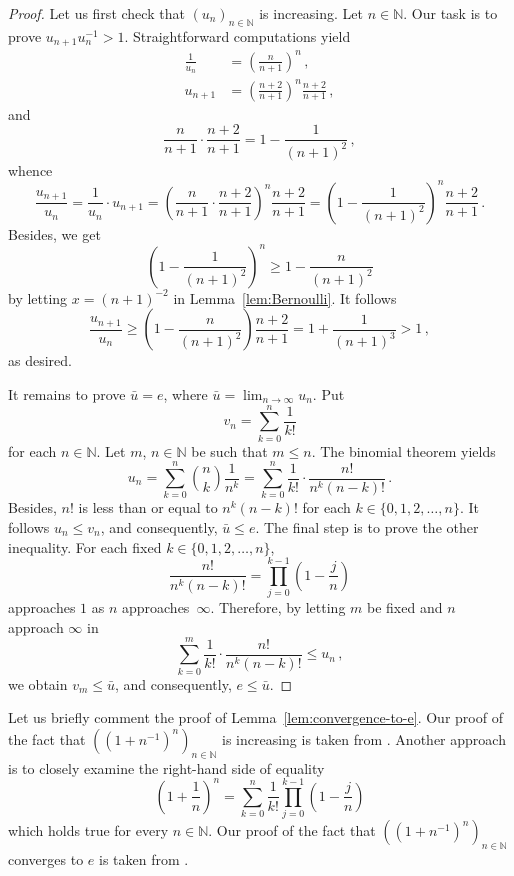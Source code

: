 \documentclass[12pt]{article}
\newcommand{\bN}{\mathbb{N}} %
\begin{document}
\begin{proof}
  Let us first check that $\left( u_n \right)_{n \in \bN}$ is increasing.
  Let $n \in \bN$.
  Our task is to prove $u_{n + 1} u_n^{-1} > 1$.
  Straightforward computations yield
  \begin{align*}
    \frac{1}{u_n} & = \left( \frac{n}{n + 1}  \right)^n \,, \\
    u_{n + 1} & = \left( \frac{n + 2}{n + 1} \right)^n
                \frac{n + 2}{n + 1} \,,
  \end{align*}
  and 
  $$
  \frac{n}{n + 1}
  \cdot 
  \frac{n + 2}{n + 1}
  = 1 - \frac{1}{{(n + 1)}^2}  \,,
   $$
  whence 
  $$
  \frac{u_{n + 1}}{u_n}
  =
  \frac{1}{u_n} \cdot u_{n + 1}  
  =
  \left(
  \frac{n}{n + 1} \cdot \frac{n + 2}{n + 1}
  \right)^n
  \frac{n + 2}{n + 1}
  =
  \left( 1 - \frac{1}{{(n + 1)}^2} \right)^n 
  \frac{n + 2}{n + 1}\, .
  $$
  Besides, we get  
   $$
   \left( 1 - \frac{1}{{(n + 1)}^2}  \right)^n \ge  1 - \frac{n}{{(n + 1)}^2} 
 $$
 by letting $x = {(n + 1)}^{-2}$ in Lemma~\ref{lem:Bernoulli}.
 It follows
 $$
 \frac{u_{n + 1}} {u_n}
 \ge
 \left( 1 - \frac{n}{{(n + 1)}^2} \right)
  \frac{n + 2}{n + 1}
 =
 1 + \frac{1}{{(n + 1)}^3}
 > 1 \,, 
 $$
 as desired.
  
  It remains to prove $\bar u = e$, where $\bar u = \lim_{n \to \infty} u_n$.
  Put
  $$
  v_n = \sum_{k = 0}^n \frac{1}{k!} 
  $$
  for each $n \in \bN$.
  Let $m$, $n \in \bN$ be such that $m \le n$.
  The binomial theorem yields
  $$
  u_n
  = \sum_{k = 0}^n  \binom{n}{k} \frac{1}{n^k}
  = \sum_{k = 0}^n \frac{1}{k!} \cdot \frac{n!}{n^k {(n - k)}!} \, .
  $$
  Besides, $n!$ is less than or equal to $n^k {(n - k)}!$ for each $k \in \{ 0, 1, 2, \dotsc, n \}$.
  It follows $ u_n \le v_n$,  and consequently, $\bar u \le e$.
  The final step is to prove the other inequality.
 For each fixed $k \in \{ 0, 1, 2, \dotsc, n \}$, 
  $$
  \frac{n!}{{n^k (n - k)}!} = \prod_{j = 0}^{k - 1} \left( 1 - \frac{j}{n} \right) 
 $$
 approaches $1$ as $n$ approaches~$\infty$.
 Therefore, by letting $m$ be fixed and $n$ approach $\infty$ in 
 $$
  \sum_{k = 0}^m \frac{1}{k!} \cdot \frac{n!}{n^k {(n - k)}!} \le u_n \,, 
  $$
  we obtain $v_m \le \bar u$, and consequently, $e \le \bar u$.
\end{proof}


Let us briefly comment the proof of Lemma~\ref{lem:convergence-to-e}.
Our proof of the fact that $\left( \left( 1 + n^{-1} \right)^n  \right)_{n \in \bN}$
is increasing is taken from \cite{Wiener85}.
Another approach \cite{GiaquintaModicaApprox} is to closely examine the right-hand side of equality 
$$ 
\left(1 + \frac{1}{n} \right)^n = \sum_{k = 0}^n \frac{1}{k!} \prod_{j = 0}^{k - 1} \left(1 - \frac{j}{n} \right) 
$$
which holds true for every $n \in \bN$.
Our proof of the fact that
$\left( \left( 1 + n^{-1} \right)^n  \right)_{n \in \bN}$ converges to $e$ is taken from \cite{RudinPrinciples}.
\end{document}
